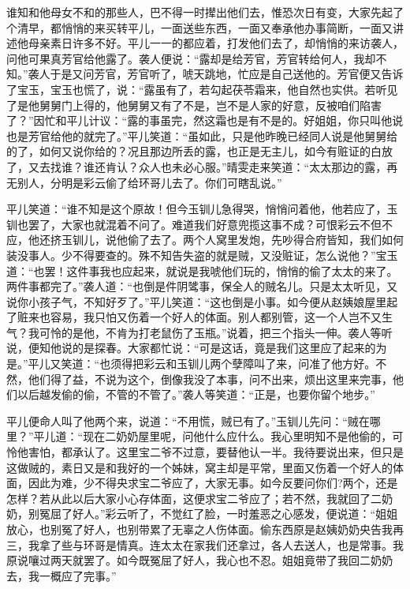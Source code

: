 \documentclass[12pt,oneside]{book}
\begin{document}
谁知和他母女不和的那些人，巴不得一时撵出他们去，惟恐次日有变，大家先起了个清早，都悄悄的来买转平儿，一面送些东西，一面又奉承他办事简断，一面又讲述他母亲素日许多不好。平儿一一的都应着，打发他们去了，却悄悄的来访袭人，问他可果真芳官给他露了。袭人便说：“露却是给芳官，芳官转给何人，我却不知。”袭人于是又问芳官，芳官听了，唬天跳地，忙应是自己送他的。芳官便又告诉了宝玉，宝玉也慌了，说：“露虽有了，若勾起茯苓霜来，他自然也实供。若听见了是他舅舅门上得的，他舅舅又有了不是，岂不是人家的好意，反被咱们陷害了？”因忙和平儿计议：“露的事虽完，然这霜也是有不是的。好姐姐，你只叫他说也是芳官给他的就完了。”平儿笑道：“虽如此，只是他昨晚已经同人说是他舅舅给的了，如何又说你给的？况且那边所丢的露，也正是无主儿，如今有赃证的白放了，又去找谁？谁还肯认？众人也未必心服。”晴雯走来笑道：“太太那边的露，再无别人，分明是彩云偷了给环哥儿去了。你们可瞎乱说。”

平儿笑道：“谁不知是这个原故！但今玉钏儿急得哭，悄悄问着他，他若应了，玉钏也罢了，大家也就混着不问了。难道我们好意兜揽这事不成？可恨彩云不但不应，他还挤玉钏儿，说他偷了去了。两个人窝里发炮，先吵得合府皆知，我们如何装没事人。少不得要查的。殊不知告失盗的就是贼，又没赃证，怎么说他？”宝玉道：“也罢！这件事我也应起来，就说是我唬他们玩的，悄悄的偷了太太的来了。两件事都完了。”袭人道：“也倒是件阴骘事，保全人的贼名儿。只是太太听见，又说你小孩子气，不知好歹了。”平儿笑道：“这也倒是小事。如今便从赵姨娘屋里起了赃来也容易，我只怕又伤着一个好人的体面。别人都别管，这一个人岂不又生气？我可怜的是他，不肯为打老鼠伤了玉瓶。”说着，把三个指头一伸。袭人等听说，便知他说的是探春。大家都忙说：“可是这话，竟是我们这里应了起来的为是。”平儿又笑道：“也须得把彩云和玉钏儿两个孽障叫了来，问准了他方好。不然，他们得了益，不说为这个，倒像我没了本事，问不出来，烦出这里来完事，他们以后越发偷的偷，不管的不管了。”袭人等笑道：“正是，也要你留个地步。”

平儿便命人叫了他两个来，说道：“不用慌，贼已有了。”玉钏儿先问：“贼在哪里？”平儿道：“现在二奶奶屋里呢，问他什么应什么。我心里明知不是他偷的，可怜他害怕，都承认了。这里宝二爷不过意，要替他认一半。我待要说出来，但只是这做贼的，素日又是和我好的一个姊妹，窝主却是平常，里面又伤着一个好人的体面，因此为难，少不得央求宝二爷应了，大家无事。如今反要问你们?两个，还是怎样？若从此以后大家小心存体面，这便求宝二爷应了；若不然，我就回了二奶奶，别冤屈了好人。”彩云听了，不觉红了脸，一时羞恶之心感发，便说道：“姐姐放心，也别冤了好人，也别带累了无辜之人伤体面。偷东西原是赵姨奶奶央告我再三，我拿了些与环哥是情真。连太太在家我们还拿过，各人去送人，也是常事。我原说嚷过两天就罢了。如今既冤屈了好人，我心也不忍。姐姐竟带了我回二奶奶去，我一概应了完事。”
\end{document}
